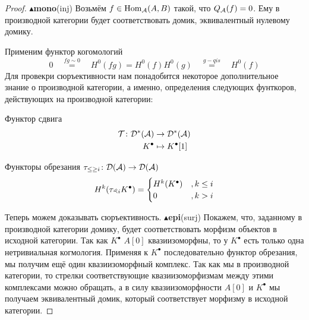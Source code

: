 \documentclass[../main.tex]{subfiles}
\begin{document}
\begin{proof}
$\blacktriangle$\textbf{mono}(inj)
Возьмём $f \in \operatorname{Hom}_{\mathcal{A}}(A, B)$ такой, что $Q_{\mathcal{A}}(f) = 0$. Ему в производной категории будет соответствовать домик, эквивалентный нулевому домику. 
\bee
{} 
\qquad
{} 
\eee
Применим функтор когомологий 
\[
0\quad \overset{fg\sim0}{=}\quad H^0 (fg) = H^0(f) H^0(g)\quad \overset{g-qis}{=}\quad H^0(f) 
\]
Для провекри сюръективности нам понадобится некоторое дополнительное знание о производной категории, а именно, определения следующих фунткоров, действующих на производной категории:
\begin{to_def}
Функтор сдвига
\begin{align*}
\mathcal{T}\colon \mathcal{D^{*}(A)}& \to \mathcal{D^{*}(A)}\\
 K^\bullet& \mapsto K^\bullet[1]
\end{align*}
\end{to_def}
\begin{to_def}
Функторы обрезания $\tau_{  \le\ge i}\colon \mathcal{D(A)} \to \mathcal{D(A)}$
\[
H^k(\tau_{ \curlyeqprec i} K^\bullet) = \begin{cases}H^k(K^\bullet) &, k \le i \\ 0 &, k>i \end{cases}
\]
\bee
{}
\qquad
{}
\eee
\end{to_def}
Теперь можем доказывать сюръективность.
$\blacktriangle$\textbf{epi}(surj) Покажем, что, заданному в производной категории домику, будет соответствовать морфизм объектов в исходной категории. Так как $K^\bullet$ $A[0]$ квазиизоморфны, то у $K^\bullet$ есть только одна нетривиальная когмология. Применяя к $K^\bullet$ последовательно функтор обрезания, мы получим ещё один квазиизоморфный комплекс. Так как мы в производной категории, то стрелки соответствующие квазиизоморфизмам между этими комплексами можно обращать, а в силу квазиизоморфности $A[0]$ и $K^\bullet$ мы получаем эквивалентный домик, который соответствует морфизму в исходной категории.

\end{proof}
\end{document}
